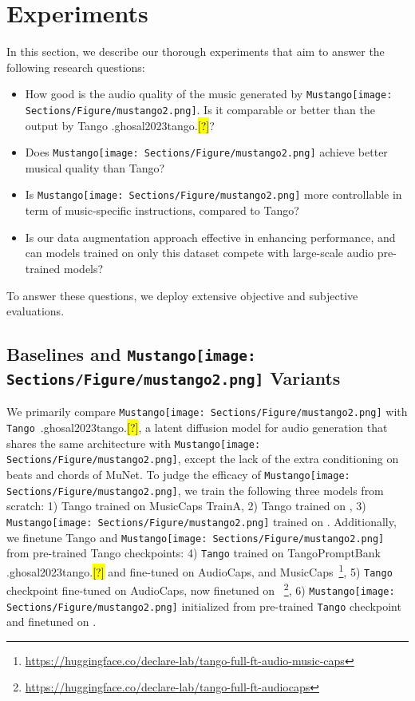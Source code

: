 \documentclass[11pt]{article}
\let\realcite\cite
\renewcommand{\cite}[1]{\ifx.#1.\hl{[?]}\else\realcite{#1}\fi}
\newcommand{\model}{\texttt{Mustango}}
\newcommand{\modelemoji}{\model{}\texttt{[image: Sections/Figure/mustango2.png]}}
\begin{document}
 \section{Experiments}
\label{sec:experiment}
In this section, we describe our thorough experiments that aim to answer the following research questions:
\begin{itemize}[itemsep=0pt, leftmargin=*, wide, labelwidth=0pt, labelindent=0pt, parsep=0pt]
    \item How good is the audio quality of the music generated by \modelemoji{}. Is it comparable or better than the output by Tango \cite{ghosal2023tango}?
    \item Does \modelemoji{} achieve better musical quality than Tango?
    \item Is \modelemoji{} more controllable in term of music-specific instructions, compared to Tango?
    \item Is our data augmentation approach effective in enhancing performance, and can models trained on only this dataset compete with large-scale audio pre-trained models?
\end{itemize}
To answer these questions, we deploy extensive objective and subjective evaluations. 


















\subsection{Baselines and \modelemoji{} Variants}




We primarily compare \modelemoji{} with \texttt{Tango}~\cite{ghosal2023tango}, a latent diffusion model for audio generation that shares the same architecture with \modelemoji{}, except the lack of the extra conditioning on beats and chords of MuNet.
To judge the efficacy of \modelemoji{}, we train the following three models from scratch:
1) Tango trained on MusicCaps TrainA, 2) Tango trained on \dataset{}, 3) \modelemoji{} trained on \dataset{}. Additionally, we finetune Tango and \modelemoji{} from pre-trained Tango checkpoints: 4) \texttt{Tango} trained on TangoPromptBank \cite{ghosal2023tango} and fine-tuned on AudioCaps, and MusicCaps~\footnote{\url{https://huggingface.co/declare-lab/tango-full-ft-audio-music-caps}}, 5) \texttt{Tango} checkpoint fine-tuned on AudioCaps, now finetuned on \dataset{}~\footnote{\url{https://huggingface.co/declare-lab/tango-full-ft-audiocaps}}, 6) \modelemoji{} initialized from pre-trained \texttt{Tango} checkpoint and finetuned on \dataset{}. 
\end{document}
